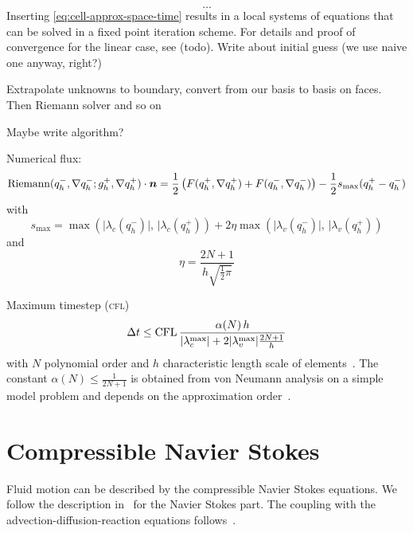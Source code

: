 \begin{equation}
  \label{eq:space-time-predictor}
  \ldots
\end{equation}
Inserting \cref{eq:cell-approx-space-time} results in a local systems of equations that can be solved in a fixed point iteration scheme.
For details and proof of convergence for the linear case, see (todo).
Write about initial guess (we use naive one anyway, right?)

Extrapolate unknowns to boundary, convert from our basis to basis on faces.
Then Riemann solver
and so on

Maybe write algorithm?




Numerical flux:
\begin{equation}
  \label{eq:rusanov-flux}
  \operatorname{Riemann}(q_h^-, \nabla q_h^-; g_h^+, \nabla q_h^+) \cdot \bm{n} =
  \frac{1}{2} \left(
    F(q_h^+, \nabla q_h^+) +
    F(q_h^-, \nabla q_h^-)
  \right) -
  \frac{1}{2} s_\text{max} (q_h^+ - q_h^-)
\end{equation}
with
\begin{equation}
  \label{eq:parabolic-penalty}
  s_\text{max}  = \max \left(
\vert \lambda_c(q_h^-) \vert, \, \vert \lambda_c(q_h^+)
\right) +
2 \eta \max \left(
\vert \lambda_v(q_h^-) \vert, \, \vert \lambda_v(q_h^+)
\right)
\end{equation}
and
\begin{equation}
  \eta = \frac{2N+1}{h \sqrt{\frac{1}{2} \pi}}
\end{equation}

Maximum timestep (\textsc{cfl})
\begin{equation}
 \Delta t \leq  \text{CFL} \, \frac{\alpha(N) \, h}{\vert \lambda_c^{\text{max}} \vert + 2 \vert \lambda_v^{\text{max}} \vert \frac{2N+1}{h}}
\end{equation}
with $N$ polynomial order and $h$ characteristic length scale of elements~\cite{dumbser2010arbitrary,gassner2008discontinuous}.
The constant $\alpha(N) \leq \frac{1}{2N+1}$ is obtained from von Neumann analysis on a simple model problem and depends on the approximation order~\cite{dumbser2008unified}.


\section{Compressible Navier Stokes}
Fluid motion can be described by the compressible Navier Stokes equations.
We follow the description in~\cite{dumbser2010arbitrary} for the Navier Stokes part.
The coupling with the advection-diffusion-reaction equations follows~\cite{hidalgo2011ader}.

